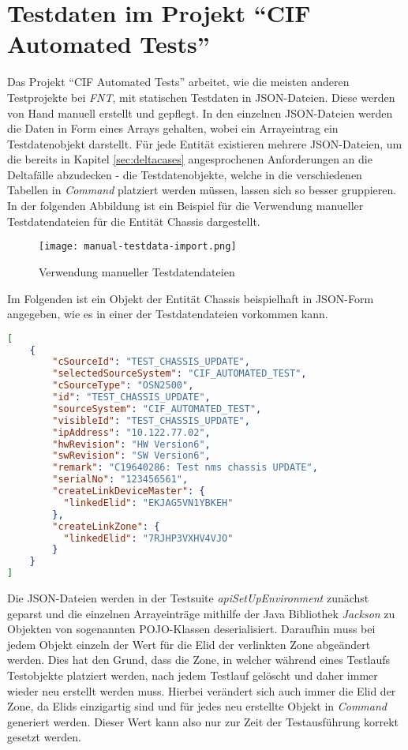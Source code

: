 \section{Testdaten im Projekt \enquote{CIF Automated Tests}}\label{sec:testdatenIst}
Das Projekt \enquote{CIF Automated Tests} arbeitet, wie die meisten anderen Testprojekte bei \textit{FNT}, mit statischen Testdaten in \ac{JSON}-Dateien. Diese werden von Hand manuell erstellt und gepflegt. In den einzelnen \ac{JSON}-Dateien werden die Daten in Form eines Arrays gehalten, wobei ein Arrayeintrag ein Testdatenobjekt darstellt. Für jede Entität existieren mehrere \ac{JSON}-Dateien, um die bereits in Kapitel \ref{sec:deltacases} angesprochenen Anforderungen an die Deltafälle abzudecken - die Testdatenobjekte, welche in die verschiedenen Tabellen in \textit{Command} platziert werden müssen, lassen sich so besser gruppieren. In der folgenden Abbildung ist ein Beispiel für die Verwendung manueller Testdatendateien für die Entität Chassis dargestellt.

\begin{figure}[h]
    \centering
    \texttt{[image: manual-testdata-import.png]}
    \caption{Verwendung manueller Testdatendateien}
\end{figure}

Im Folgenden ist ein Objekt der Entität Chassis beispielhaft in \ac{JSON}-Form angegeben, wie es in einer der Testdatendateien vorkommen kann.

\begin{lstlisting}[caption=Testdaten für ein Chassis in JSON-Form, label=JSON-Testdaten,language=json]
[
    {
        "cSourceId": "TEST_CHASSIS_UPDATE",
        "selectedSourceSystem": "CIF_AUTOMATED_TEST",
        "cSourceType": "OSN2500",
        "id": "TEST_CHASSIS_UPDATE",
        "sourceSystem": "CIF_AUTOMATED_TEST",
        "visibleId": "TEST_CHASSIS_UPDATE",
        "ipAddress": "10.122.77.02",
        "hwRevision": "HW Version6",
        "swRevision": "SW Version6",
        "remark": "C19640286: Test nms chassis UPDATE",
        "serialNo": "123456561",
        "createLinkDeviceMaster": {
          "linkedElid": "EKJAG5VN1YBKEH"
        },
        "createLinkZone": {
          "linkedElid": "7RJHP3VXHV4VJO"
        }
    }
]
\end{lstlisting}

Die \ac{JSON}-Dateien werden in der Testsuite \textit{apiSetUpEnvironment} zunächst geparst und die einzelnen Arrayeinträge mithilfe der Java Bibliothek \textit{Jackson} zu Objekten von sogenannten \ac{POJO}-Klassen deserialisiert. Daraufhin muss bei jedem Objekt einzeln der Wert für die \ac{Elid} der verlinkten Zone abgeändert werden. Dies hat den Grund, dass die Zone, in welcher während eines Testlaufs Testobjekte platziert werden, nach jedem Testlauf gelöscht und daher immer wieder neu erstellt werden muss. Hierbei verändert sich auch immer die \ac{Elid} der Zone, da \ac{Elid}s einzigartig sind und für jedes neu erstellte Objekt in \textit{Command} generiert werden. Dieser Wert kann also nur zur Zeit der Testausführung korrekt gesetzt werden.

